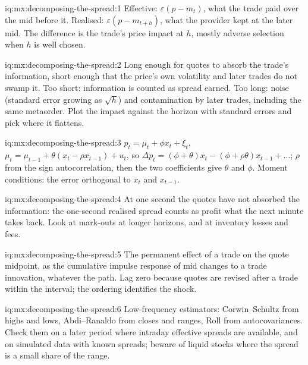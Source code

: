 \begin{solution}{iq:mx:decomposing-the-spread:1}
Effective: $\varepsilon(p-m_t)$, what the trade paid over the mid before it. Realised: $\varepsilon(p-m_{t+h})$, what the provider kept at the later mid. The
difference is the trade's price impact at $h$, mostly adverse selection when $h$ is well chosen.
\end{solution}

\begin{solution}{iq:mx:decomposing-the-spread:2}
Long enough for quotes to absorb the trade's information, short enough that the price's own volatility and later trades do not swamp it. Too short:
information is counted as spread earned. Too long: noise (standard error growing as $\sqrt h$) and contamination by later trades, including the same
metaorder. Plot the impact against the horizon with standard errors and pick where it flattens.
\end{solution}

\begin{solution}{iq:mx:decomposing-the-spread:3}
$p_t=\mu_t+\phi x_t+\xi_t$, $\mu_t=\mu_{t-1}+\theta(x_t-\rho x_{t-1})+u_t$, so $\Delta p_t=(\phi+\theta)x_t-(\phi+\rho\theta)x_{t-1}+\dots$; $\rho$ from the
sign autocorrelation, then the two coefficients give $\theta$ and $\phi$. Moment conditions: the error orthogonal to $x_t$ and $x_{t-1}$.
\end{solution}

\begin{solution}{iq:mx:decomposing-the-spread:4}
At one second the quotes have not absorbed the information: the one-second realised spread counts as profit what the next minute takes back. Look at
mark-outs at longer horizons, and at inventory losses and fees.
\end{solution}

\begin{solution}{iq:mx:decomposing-the-spread:5}
The permanent effect of a trade on the quote midpoint, as the cumulative impulse response of mid changes to a trade innovation, whatever the path. Lag
zero because quotes are revised after a trade within the interval; the ordering identifies the shock.
\end{solution}

\begin{solution}{iq:mx:decomposing-the-spread:6}
Low-frequency estimators: Corwin--Schultz from highs and lows, Abdi--Ranaldo from closes and ranges, Roll from autocovariances. Check them on a later
period where intraday effective spreads are available, and on simulated data with known spreads; beware of liquid stocks where the spread is a small
share of the range.
\end{solution}
